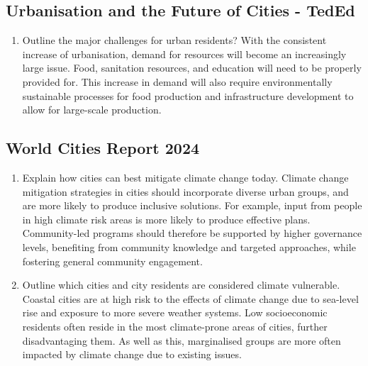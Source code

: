 	\subsection{Urbanisation and the Future of Cities - TedEd}
		\begin{enumerate}
			\item Outline the major challenges for urban residents?
				\subitem With the consistent increase of urbanisation, demand for resources will become an increasingly large issue. Food, sanitation resources, and education will need to be properly provided for. This increase in demand will also require environmentally sustainable processes for food production and infrastructure development to allow for large-scale production. 
		\end{enumerate}
	\subsection{World Cities Report 2024}
		\begin{enumerate}
			\item Explain how cities can best mitigate climate change today.
				\subitem Climate change mitigation strategies in cities should incorporate diverse urban groups, and are more likely to produce inclusive solutions. For example, input from people in high climate risk areas is more likely to produce effective plans. Community-led programs should therefore be supported by higher governance levels, benefiting from community knowledge and targeted approaches, while fostering general community engagement.
			\item Outline which cities and city residents are considered climate vulnerable.
				\subitem Coastal cities are at high risk to the effects of climate change due to sea-level rise and exposure to more severe weather systems. Low socioeconomic residents often reside in the most climate-prone areas of cities, further disadvantaging them. As well as this, marginalised groups are more often impacted by climate change due to existing issues.
		\end{enumerate}

